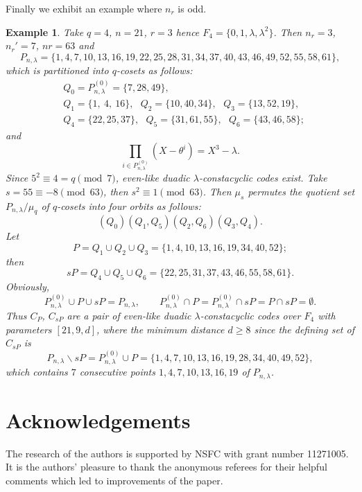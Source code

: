 \documentclass{article}
\newtheorem{Example}[Theorem]{Example}
\numberwithin{equation}{section}
\numberwithin{table}{section}
\begin{document}
Finally we exhibit an example where $n_r$ is odd.

\begin{Example}\rm Take $q=4$, $n=21$, $r=3$
hence $F_4=\{0,1,\lambda,\lambda^2\}$. Then
$n_r=3$,~ $n_r'=7$, $nr=63$ and
$$P_{n,\lambda}=\{1,4,7,10,13,16,19,22,25,28,31,34,37,40,43,46,49,52,55,58,61\},$$
which is partitioned into $q$-cosets as follows:
\begin{align*}
&Q_0=P_{n,\lambda}^{(0)}=\{7,28,49\},\\
&Q_1=\{1,~4,~16\},~~~Q_2=\{10,40,34\},~~~Q_3=\{13,52,19\},\\
&Q_4=\{22,25,37\},~~~Q_5=\{31,61,55\},~~~Q_6=\{43,46,58\};
\end{align*}
and
$$ \prod_{i\in P_{n,\lambda}^{(0)}}(X-\theta^i)=X^3-\lambda. $$
Since  $5^2\equiv 4=q\pmod 7$, even-like duadic $\lambda$-constacyclic
codes exist. Take $s=55\equiv-8\pmod{63}$, then $s^2\equiv 1\pmod{63}$.
Then $\mu_s$ permutes the quotient set $P_{n,\lambda}/\mu_q$ of $q$-cosets
into four orbits as follows:
$$  (Q_0)(Q_1,Q_5)(Q_2,Q_6)(Q_3,Q_4). $$
Let
$$ P=Q_1\cup Q_2\cup Q_3=\{1,4,10,13,16,19,34,40,52\}; $$
then
$$ sP=Q_4\cup Q_5\cup Q_6=\{22,25,31,37,43,46,55,58,61\}. $$
Obviously,
$$ P_{n,\lambda}^{(0)}\cup P\cup sP=P_{n,\lambda},\qquad
 P_{n,\lambda}^{(0)}\cap P=P_{n,\lambda}^{(0)}\cap sP=P\cap sP=\emptyset. $$
Thus $C_P$, $C_{sP}$ are a pair of even-like duadic $\lambda$-constacyclic codes
over $F_4$ with parameters $[21,9,d]$, where the minimum distance $d\ge 8$
since the defining set of $C_{sP}$ is
$$P_{n,\lambda}\backslash{sP}=P_{n,\lambda}^{(0)}\cup P
 =\{1,4,7,10,13,16,19,28,34,40,49,52\},
$$
which contains $7$ consecutive points $1,4,7,10,13,16,19$ of $P_{n,\lambda}$.
\end{Example}


\section*{Acknowledgements}
The research of the authors is supported
by NSFC with grant number 11271005.
It is the authors' pleasure to thank the anonymous referees for 
their helpful comments which led to improvements of the paper.
\end{document}
